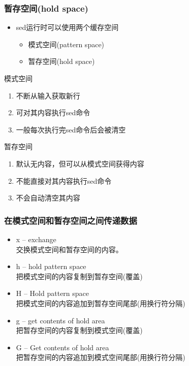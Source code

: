\documentclass[xcolor=svgnames,presentation]{beamer}
\begin{document}
\begin{frame}
\frametitle{暂存空间(hold space)}
\label{sec-2-1-14}
\begin{itemize}

\item sed运行时可以使用两个缓存空间
\label{sec-2-1-14-1}%
\begin{itemize}

\item 模式空间(pattern space)
\label{sec-2-1-14-1-1}%

\item 暂存空间(hold space)
\label{sec-2-1-14-1-2}%
\end{itemize} %
\end{itemize} %
\begin{exampleblock}{模式空间}
\label{sec-2-1-14-2}

\begin{enumerate}
\item 不断从输入获取新行
\item 可对其内容执行sed命令
\item 一般每次执行完sed命令后会被清空
\end{enumerate}
\end{exampleblock}
\begin{block}{暂存空间}
\label{sec-2-1-14-3}

\begin{enumerate}
\item 默认无内容，但可以从模式空间获得内容
\item 不能直接对其内容执行sed命令
\item 不会自动清空其内容
\end{enumerate}
\end{block}
\end{frame}
\begin{frame}
\frametitle{在模式空间和暂存空间之间传递数据}
\label{sec-2-1-15}
\begin{itemize}

\item x -- exchange\\
\label{sec-2-1-15-1}%
交换模式空间和暂存空间的内容。

\item h -- hold pattern space\\
\label{sec-2-1-15-2}%
把模式空间的内容复制到暂存空间(覆盖)

\item H -- Hold pattern space\\
\label{sec-2-1-15-3}%
把模式空间的内容追加到暂存空间尾部(用换行符分隔)

\item g -- get contents of hold area\\
\label{sec-2-1-15-4}%
把暂存空间的内容复制到模式空间(覆盖)

\item G -- Get contents of hold area\\
\label{sec-2-1-15-5}%
把暂存空间的内容追加到模式空间尾部(用换行符分隔)
\end{itemize} %
\end{frame}
\end{document}

